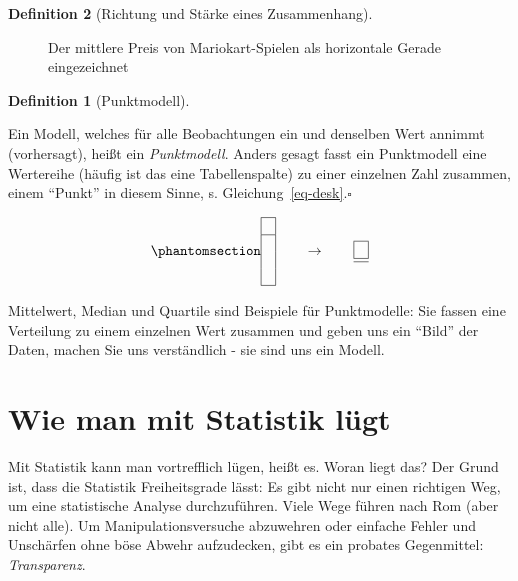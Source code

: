 \documentclass[
  a4paper,
  DIV=11]{scrreprt}
\theoremstyle{definition}
\theoremstyle{definition}
\theoremstyle{definition}
\newtheorem{definition}{Definition}[chapter]
\theoremstyle{remark}
\begin{document}
\begin{definition}[Richtung und Stärke eines
Zusammenhang]
\begin{figure}
\begin{minipage}{0.50\linewidth}
{}


\end{minipage}%

\caption{\label{fig-mw3}Der mittlere Preis von Mariokart-Spielen als
horizontale Gerade eingezeichnet}

\end{figure}%

\begin{definition}[Punktmodell]\protect\hypertarget{def-punktmodell}{}\label{def-punktmodell}

Ein Modell, welches für alle Beobachtungen ein und denselben Wert
annimmt (vorhersagt), heißt ein \emph{Punktmodell}. Anders gesagt fasst
ein Punktmodell eine Wertereihe (häufig ist das eine Tabellenspalte) zu
einer einzelnen Zahl zusammen, einem ``Punkt'' in diesem Sinne, s.
Gleichung~\ref{eq-desk}.\(\square\)

\end{definition}

\begin{equation}\phantomsection\label{eq-desk}{\begin{array}{|c|} \hline \\ \hline \\\\\\ \hline \end{array} \qquad \rightarrow \qquad \begin{array}{|c|} \hline \\ \hline  \hline \end{array}}\end{equation}

Mittelwert, Median und Quartile sind Beispiele für Punktmodelle: Sie
fassen eine Verteilung zu einem einzelnen Wert zusammen und geben uns
ein ``Bild'' der Daten, machen Sie uns verständlich - sie sind uns ein
Modell.

\section{Wie man mit Statistik
lügt}\label{wie-man-mit-statistik-luxfcgt-2}

Mit Statistik kann man vortrefflich lügen, heißt es. Woran liegt das?
Der Grund ist, dass die Statistik Freiheitsgrade lässt: Es gibt nicht
nur einen richtigen Weg, um eine statistische Analyse durchzuführen.
Viele Wege führen nach Rom (aber nicht alle). Um Manipulationsversuche
abzuwehren oder einfache Fehler und Unschärfen ohne böse Abwehr
aufzudecken, gibt es ein probates Gegenmittel: \emph{Transparenz}.


\end{definition}
\end{document}
